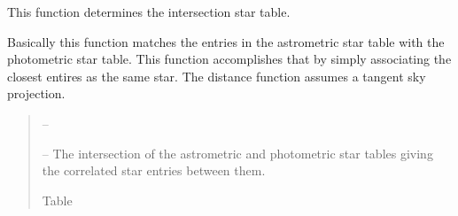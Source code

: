 \documentclass[letterpaper,11pt,english]{sphinxmanual}
\begin{document}
\begin{savenotes}
\begin{fulllineitems}
\begin{savenotes}
\begin{fulllineitems}
\begin{quote}
\begin{description}
\end{description}\end{quote}

\end{fulllineitems}\end{savenotes}


\begin{savenotes}\begin{fulllineitems}
\label{\detokenize{code/opihiexarata.photometry.solution:opihiexarata.photometry.solution.PhotometricSolution.__calculate_intersection_star_table}}
\pysigstartsignatures
{}
\pysigstopsignatures
\sphinxAtStartPar
This function determines the intersection star table.

\sphinxAtStartPar
Basically this function matches the entries in the astrometric star
table with the photometric star table. This function accomplishes that
by simply associating the closest entires as the same star. The
distance function assumes a tangent sky projection.
\begin{quote}\begin{description}
\sphinxAtStartPar
{} – 

\sphinxAtStartPar
{} – The intersection of the astrometric and photometric star tables
giving the correlated star entries between them.

\sphinxAtStartPar
Table

\end{description}\end{quote}

\end{fulllineitems}\end{savenotes}



\end{fulllineitems}
\end{savenotes}
\end{document}
